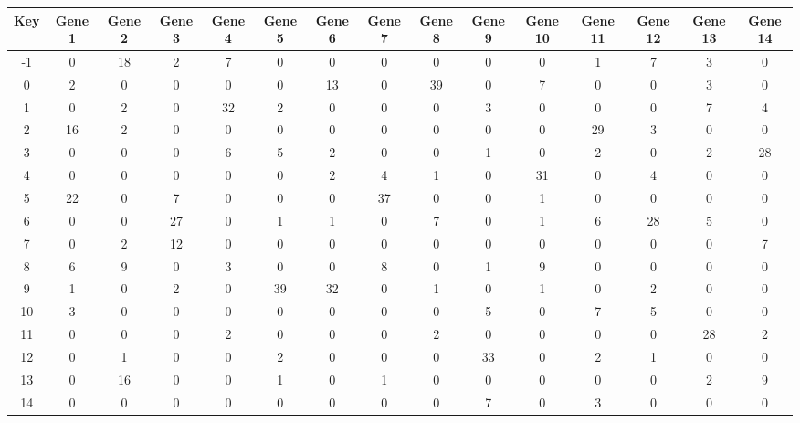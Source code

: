 \begin{tabular}{|c|c|c|c|c|c|c|c|c|c|c|c|c|c|c|}
\hline
Key & Gene 1 & Gene 2 & Gene 3 & Gene 4 & Gene 5 & Gene 6 & Gene 7 & Gene 8 & Gene 9 & Gene 10 & Gene 11 & Gene 12 & Gene 13 & Gene 14 \\
\hline
-1 & 0 & 18 & 2 & 7 & 0 & 0 & 0 & 0 & 0 & 0 & 1 & 7 & 3 & 0 \\
0 & 2 & 0 & 0 & 0 & 0 & 13 & 0 & 39 & 0 & 7 & 0 & 0 & 3 & 0 \\
1 & 0 & 2 & 0 & 32 & 2 & 0 & 0 & 0 & 3 & 0 & 0 & 0 & 7 & 4 \\
2 & 16 & 2 & 0 & 0 & 0 & 0 & 0 & 0 & 0 & 0 & 29 & 3 & 0 & 0 \\
3 & 0 & 0 & 0 & 6 & 5 & 2 & 0 & 0 & 1 & 0 & 2 & 0 & 2 & 28 \\
4 & 0 & 0 & 0 & 0 & 0 & 2 & 4 & 1 & 0 & 31 & 0 & 4 & 0 & 0 \\
5 & 22 & 0 & 7 & 0 & 0 & 0 & 37 & 0 & 0 & 1 & 0 & 0 & 0 & 0 \\
6 & 0 & 0 & 27 & 0 & 1 & 1 & 0 & 7 & 0 & 1 & 6 & 28 & 5 & 0 \\
7 & 0 & 2 & 12 & 0 & 0 & 0 & 0 & 0 & 0 & 0 & 0 & 0 & 0 & 7 \\
8 & 6 & 9 & 0 & 3 & 0 & 0 & 8 & 0 & 1 & 9 & 0 & 0 & 0 & 0 \\
9 & 1 & 0 & 2 & 0 & 39 & 32 & 0 & 1 & 0 & 1 & 0 & 2 & 0 & 0 \\
10 & 3 & 0 & 0 & 0 & 0 & 0 & 0 & 0 & 5 & 0 & 7 & 5 & 0 & 0 \\
11 & 0 & 0 & 0 & 2 & 0 & 0 & 0 & 2 & 0 & 0 & 0 & 0 & 28 & 2 \\
12 & 0 & 1 & 0 & 0 & 2 & 0 & 0 & 0 & 33 & 0 & 2 & 1 & 0 & 0 \\
13 & 0 & 16 & 0 & 0 & 1 & 0 & 1 & 0 & 0 & 0 & 0 & 0 & 2 & 9 \\
14 & 0 & 0 & 0 & 0 & 0 & 0 & 0 & 0 & 7 & 0 & 3 & 0 & 0 & 0 \\
\hline
\end{tabular}